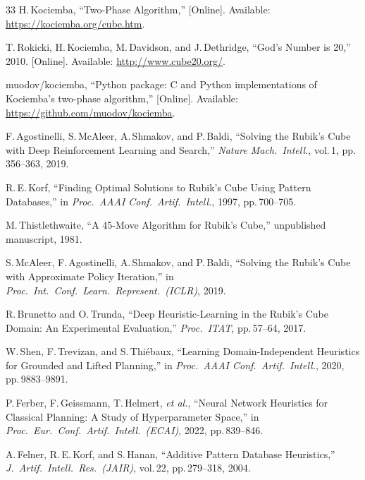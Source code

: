\documentclass[conference]{IEEEtran}
\begin{document}
\begin{thebibliography}{33}
H.\,Kociemba, ``Two-Phase Algorithm,'' [Online]. Available:
\url{https://kociemba.org/cube.htm}.

T.\,Rokicki, H.\,Kociemba, M.\,Davidson, and J.\,Dethridge,
``God's Number is 20,'' 2010. [Online]. Available:
\url{http://www.cube20.org/}.

muodov/kociemba, ``Python package: C and Python implementations of
Kociemba's two-phase algorithm,'' [Online]. Available:
\url{https://github.com/muodov/kociemba}.

F.\,Agostinelli, S.\,McAleer, A.\,Shmakov, and P.\,Baldi,
``Solving the {R}ubik's {C}ube with Deep Reinforcement Learning and
Search,'' \textit{Nature Mach.\ Intell.}, vol.\,1, pp.\,356--363, 2019.

R.\,E.\,Korf, ``Finding Optimal Solutions to {R}ubik's {C}ube Using
Pattern Databases,'' in \textit{Proc.\ AAAI Conf.\ Artif.\ Intell.},
1997, pp.\,700--705.

M.\,Thistlethwaite, ``A 45-Move Algorithm for {R}ubik's {C}ube,''
unpublished manuscript, 1981.

S.\,McAleer, F.\,Agostinelli, A.\,Shmakov, and P.\,Baldi,
``Solving the {R}ubik's {C}ube with Approximate Policy Iteration,''
in \textit{Proc.\ Int.\ Conf.\ Learn.\ Represent.\ (ICLR)}, 2019.

R.\,Brunetto and O.\,Trunda, ``Deep Heuristic-Learning in the
{R}ubik's {C}ube Domain: An Experimental Evaluation,''
\textit{Proc.\ ITAT}, pp.\,57--64, 2017.

W.\,Shen, F.\,Trevizan, and S.\,Thi\'ebaux, ``Learning
Domain-Independent Heuristics for Grounded and Lifted Planning,''
in \textit{Proc.\ AAAI Conf.\ Artif.\ Intell.}, 2020,
pp.\,9883--9891.

P.\,Ferber, F.\,Geissmann, T.\,Helmert, \textit{et al.},
``Neural Network Heuristics for Classical Planning: A Study of
Hyperparameter Space,'' in \textit{Proc.\ Eur.\ Conf.\ Artif.\
Intell.\ (ECAI)}, 2022, pp.\,839--846.

A.\,Felner, R.\,E.\,Korf, and S.\,Hanan,
``Additive Pattern Database Heuristics,'' \textit{J.\ Artif.\
Intell.\ Res.\ (JAIR)}, vol.\,22, pp.\,279--318, 2004.


\end{thebibliography}
\end{document}
